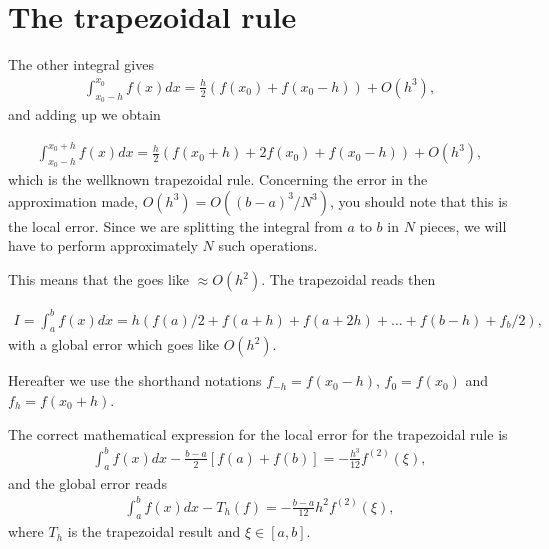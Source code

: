 \documentclass[letterpaper,10pt,english]{sphinxmanual}
\begin{document}
\section{The trapezoidal rule}
\label{\detokenize{chapter1:the-trapezoidal-rule}}
The other integral gives
\begin{equation*}
\begin{split}
\int_{x_0-h}^{x_0}f(x)dx=\frac{h}{2}\left(f(x_0) + f(x_0-h)\right)+O(h^3),
\end{split}
\end{equation*}
and adding up we obtain




\begin{equation*}
\begin{split}
\begin{equation}
   \int_{x_0-h}^{x_0+h}f(x)dx=\frac{h}{2}\left(f(x_0+h) + 2f(x_0) + f(x_0-h)\right)+O(h^3),
\label{eq:trapez} \tag{44}
\end{equation}
\end{split}
\end{equation*}
which is the well\sphinxhyphen{}known trapezoidal rule.  Concerning the error in the approximation made,
\(O(h^3)=O((b-a)^3/N^3)\), you should  note
that this is the local error.  Since we are splitting the integral from
\(a\) to \(b\) in \(N\) pieces, we will have to perform approximately \(N\)
such operations.

This means that the  goes like \(\approx O(h^2)\).
The trapezoidal reads then




\begin{equation*}
\begin{split}
\begin{equation}
   I=\int_a^bf(x) dx=h\left(f(a)/2 + f(a+h) +f(a+2h)+
                          \dots +f(b-h)+ f_{b}/2\right),
\label{eq:trapez1} \tag{45}
\end{equation}
\end{split}
\end{equation*}
with a global error which goes like \(O(h^2)\).

Hereafter we use the shorthand notations \(f_{-h}=f(x_0-h)\), \(f_{0}=f(x_0)\)
and \(f_{h}=f(x_0+h)\).

The correct mathematical expression for the local error for the trapezoidal rule is
\begin{equation*}
\begin{split}
\int_a^bf(x)dx -\frac{b-a}{2}\left[f(a)+f(b)\right]=-\frac{h^3}{12}f^{(2)}(\xi),
\end{split}
\end{equation*}
and the global error reads
\begin{equation*}
\begin{split}
\int_a^bf(x)dx -T_h(f)=-\frac{b-a}{12}h^2f^{(2)}(\xi),
\end{split}
\end{equation*}
where \(T_h\) is the trapezoidal result and \(\xi \in [a,b]\).
\end{document}
